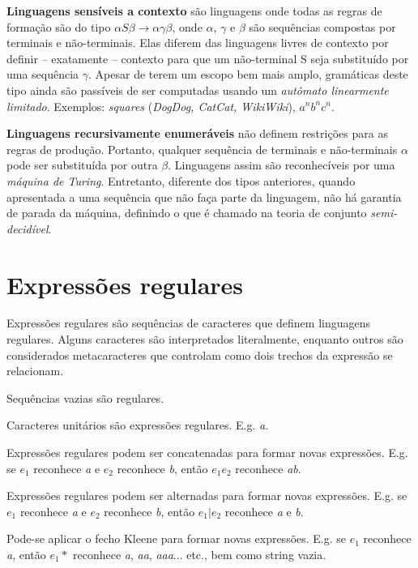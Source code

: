 \documentclass[a4paper,12pt,oneside,onecolumn]{uerj}
\begin{document}
{\bf Linguagens sensíveis a contexto} são linguagens onde todas as regras de formação são do tipo $\alpha S\beta\rightarrow \alpha\gamma\beta$, onde $\alpha$, $\gamma$ e $\beta$ são sequências compostas por terminais e não-terminais. Elas diferem das linguagens livres de contexto por definir -- exatamente -- contexto para que um não-terminal S seja substituído por uma sequência $\gamma$. Apesar de terem um escopo bem mais amplo, gramáticas deste tipo ainda são passíveis de ser computadas usando um \emph{autômato linearmente limitado}. Exemplos: \emph{squares} (\emph{DogDog, CatCat, WikiWiki}), $a^nb^nc^n$.

{\bf Linguagens recursivamente enumeráveis} não definem restrições para as regras de produção. Portanto, qualquer sequência de terminais e não-terminais $\alpha$ pode ser substituída por outra $\beta$. Linguagens assim são reconhecíveis por uma \emph{máquina de Turing}. Entretanto, diferente dos tipos anteriores, quando apresentada a uma sequência que não faça parte da linguagem, não há garantia de parada da máquina, definindo o que é chamado na teoria de conjunto \emph{semi-decidível}.


\section{Expressões regulares}

Expressões regulares são sequências de caracteres que definem linguagens regulares. Alguns caracteres são interpretados literalmente, enquanto outros são considerados metacaracteres que controlam como dois trechos da expressão se relacionam.

Sequências vazias são regulares.

Caracteres unitários são expressões regulares. E.g. \emph{a}.

Expressões regulares podem ser concatenadas para formar novas expressões. E.g. se $e_1$ reconhece \emph{a} e $e_2$ reconhece \emph{b}, então $e_1e_2$ reconhece \emph{ab}.

Expressões regulares podem ser alternadas para formar novas expressões. E.g. se $e_1$ reconhece \emph{a} e $e_2$ reconhece \emph{b}, então $e_1|e_2$ reconhece \emph{a} e \emph{b}.

Pode-se aplicar o fecho Kleene para formar novas expressões. E.g. se $e_1$ reconhece \emph{a}, então $e_1*$ reconhece \emph{a}, \emph{aa}, \emph{aaa}... etc., bem como string vazia.
\end{document}
